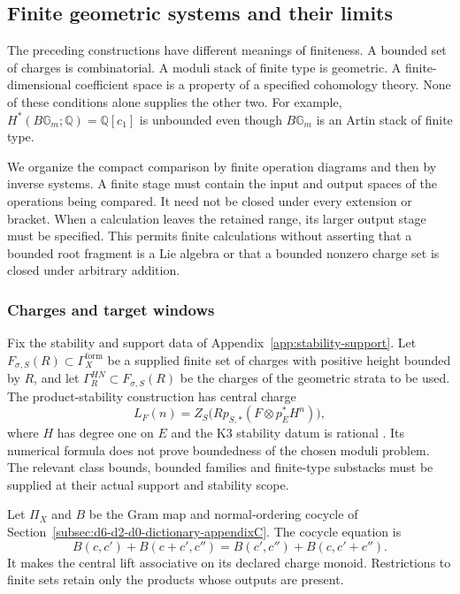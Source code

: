 \subsection{Finite geometric systems and their limits}
\label{subsec:eight-finite-constructions}

The preceding constructions have different meanings of finiteness.
A bounded set of charges is combinatorial. A moduli stack of finite
type is geometric. A finite-dimensional coefficient space is a
property of a specified cohomology theory. None of these conditions
alone supplies the other two. For example,
\(H^*(B\mathbb G_m;\mathbb Q)=\mathbb Q[c_1]\) is unbounded even
though \(B\mathbb G_m\) is an Artin stack of finite type.

We organize the compact comparison by finite operation diagrams and
then by inverse systems. A finite stage must contain the input and
output spaces of the operations being compared. It need not be
closed under every extension or bracket. When a calculation leaves
the retained range, its larger output stage must be specified.
This permits finite calculations without asserting that a bounded
root fragment is a Lie algebra or that a bounded nonzero charge set
is closed under arbitrary addition.

\subsubsection*{Charges and target windows}

Fix the stability and support data of
Appendix~\ref{app:stability-support}. Let
\(F_{\sigma,S}(R)\subset\Gamma_X^{\mathrm{form}}\) be a supplied
finite set of charges with positive height bounded by \(R\), and
let \(\Gamma_R^{HN}\subset F_{\sigma,S}(R)\) be the charges of
the geometric strata to be used. The product-stability construction
has central charge
\[
 L_F(n)=Z_S\bigl(Rp_{S,*}(F\otimes p_E^*H^n)\bigr),
\]
where \(H\) has degree one on \(E\) and the K3 stability datum is
rational \cite{LiuProductStability}. Its numerical formula does not
prove boundedness of the chosen moduli problem. The relevant class
bounds, bounded families and finite-type substacks must be supplied
at their actual support and stability scope.

Let \(\Pi_X\) and \(B\) be the Gram map and normal-ordering
cocycle of Section~\ref{subsec:d6-d2-d0-dictionary-appendixC}.
The cocycle equation is
\[
 B(c,c')+B(c+c',c'')=B(c',c'')+B(c,c'+c'').
\]
It makes the central lift associative on its declared charge monoid.
Restrictions to finite sets retain only the products whose outputs
are present.

